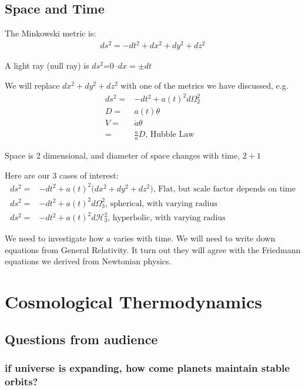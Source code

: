 \documentclass[]{article}
\begin{document}
 \subsection{Space and Time}\label{sec:space:time}
 
 The Minkowski metric is:
 \begin{align*}
 	ds^2 = - dt^2 + dx^2 + dy^2 + dz^2 
 \end{align*}
 
 A light ray (null ray) is $ds^2$=0--$dx=\pm dt$
 
 We will replace $ dx^2 + dy^2 + dz^2 $ with one of the metrics we have discussed, e.g.
  \begin{align*}
 	ds^2 =& - dt^2 + a(t)^2d\Omega_2^2\\
 	D =& a(t) \theta\\
 	V =& \dot{a}\theta\\ 
 	=& \frac{\dot{a}}{a} D \text{, Hubble Law}
 \end{align*}
 
  Space is 2 dimensional, and diameter of space changes with time, $2+1$
  
 Here are our 3 cases of interest:
 \begin{align*}
 	ds^2 =& -dt^2 + a(t)^2 \big( dx^2 + dy^2 + dz^2 \big) \text{, Flat, but scale factor depends on time}\\
 	ds^2 =& - dt^2 + a(t)^2d\Omega_3^2 \text{, spherical, with varying radius}\\
 	ds^2 =& - dt^2 + a(t)^2d\mathcal{H}_3^2 \text{, hyperbolic, with varying radius}
 \end{align*}

We need to investigate how $a$ varies with time. We will need to write down equations from General Relativity. It turn out they will agree with the Friedmann equations we derived from Newtonian physics.
\section{Cosmological Thermodynamics}\label{sec:cosmological:thermodynamics}


\subsection{Questions from audience}
\subsubsection{if universe is expanding, how come planets maintain stable orbits?}
\end{document}

